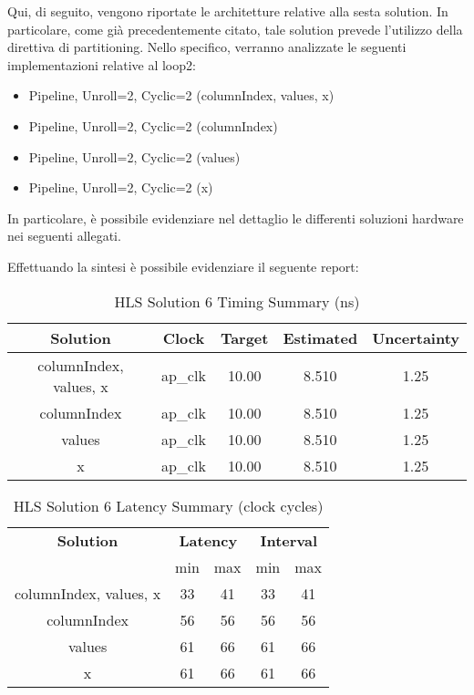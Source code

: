 Qui, di seguito, vengono riportate le architetture relative alla sesta solution. In particolare, come già precedentemente citato, tale solution prevede l'utilizzo della direttiva di partitioning. Nello specifico, verranno analizzate le seguenti implementazioni relative al loop2:
\begin{itemize}
	\item Pipeline, Unroll=2, Cyclic=2 (columnIndex, values, x)
	\item Pipeline, Unroll=2, Cyclic=2 (columnIndex)
	\item Pipeline, Unroll=2, Cyclic=2 (values)
	\item Pipeline, Unroll=2, Cyclic=2 (x)
\end{itemize}

In particolare, è possibile evidenziare nel dettaglio le differenti soluzioni hardware nei seguenti allegati.





Effettuando la sintesi è possibile evidenziare il seguente report:\\

\begin{table}[H]
	\centering
	\begin{tabular}{|c|c|c|c|c|}
		\hline
		\textbf{Solution} & \textbf{Clock} & \textbf{Target} & \textbf{Estimated} & \textbf{Uncertainty} \\
		\hline
		columnIndex, values, x & ap\_clk & 10.00 & 8.510 & 1.25 \\
		\hline
		columnIndex & ap\_clk & 10.00 & 8.510 & 1.25 \\
		\hline
		values & ap\_clk & 10.00 & 8.510 & 1.25 \\
		\hline
		x & ap\_clk & 10.00 & 8.510 & 1.25 \\
		\hline
	\end{tabular}
	\caption{HLS Solution 6 Timing Summary (ns)}
	\label{tab:hls-solution-6-timing-summary}
\end{table}

\begin{table}[H]
	\centering
	\begin{tabular}{|c|c|c|c|c|}
		\hline
		\multicolumn{1}{|c|}{\textbf{Solution}} & \multicolumn{2}{|c|}{\textbf{Latency}} & \multicolumn{2}{|c|}{\textbf{Interval}} \\
		& min & max & min & max \\
		\hline
		columnIndex, values, x & 33 & 41 & 33 & 41 \\
		\hline
		columnIndex & 56 & 56 & 56 & 56 \\
		\hline
		values & 61 & 66 & 61 & 66 \\
		\hline
		x & 61 & 66 & 61 & 66 \\
		\hline
	\end{tabular}
	\caption{HLS Solution 6 Latency Summary (clock cycles)}
	\label{tab:hls-solution-6-latency-summary}
\end{table}

